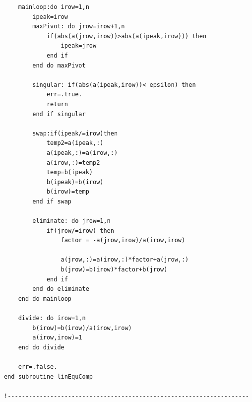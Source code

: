 \documentclass[a4paper,11pt]{thesis}
\begin{document}
\begin{verbatim}
    mainloop:do irow=1,n
        ipeak=irow
        maxPivot: do jrow=irow+1,n
            if(abs(a(jrow,irow))>abs(a(ipeak,irow))) then
                ipeak=jrow
            end if
        end do maxPivot

        singular: if(abs(a(ipeak,irow))< epsilon) then
            err=.true.
            return
        end if singular

        swap:if(ipeak/=irow)then
            temp2=a(ipeak,:)
            a(ipeak,:)=a(irow,:)
            a(irow,:)=temp2
            temp=b(ipeak)
            b(ipeak)=b(irow)
            b(irow)=temp
        end if swap

        eliminate: do jrow=1,n
            if(jrow/=irow) then
                factor = -a(jrow,irow)/a(irow,irow)

                a(jrow,:)=a(irow,:)*factor+a(jrow,:)
                b(jrow)=b(irow)*factor+b(jrow)
            end if
        end do eliminate
    end do mainloop

    divide: do irow=1,n
        b(irow)=b(irow)/a(irow,irow)
        a(irow,irow)=1
    end do divide

    err=.false.
end subroutine linEquComp

!--------------------------------------------------------------------
\end{verbatim}
\normalsize
\end{document}
